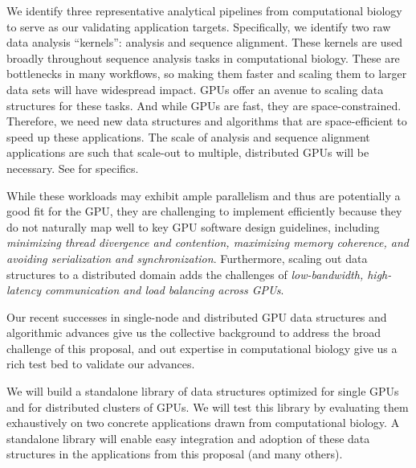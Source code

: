 
We identify three representative analytical pipelines from computational biology to serve as our validating application targets.
Specifically, we identify two raw data analysis ``kernels'':
\Kmer analysis and sequence alignment. These kernels are used broadly
throughout sequence analysis tasks in computational biology. These are bottlenecks in many
workflows, so making them faster and scaling them to larger data
sets will have widespread impact. GPUs offer an avenue to scaling data
structures for these tasks. And while GPUs are fast, they are space-constrained.  Therefore,
we need new data structures and algorithms that are space-efficient to speed up
these applications. The scale of \Kmer analysis and sequence alignment applications are such that scale-out to multiple, distributed GPUs will be necessary. See
 for specifics.

While these workloads may exhibit ample parallelism and thus are potentially a
good fit for the GPU, they are challenging to implement efficiently because
they do not naturally map well to key GPU software design guidelines, including
\emph{minimizing thread divergence and contention, maximizing memory coherence,
and avoiding serialization and synchronization}. Furthermore, scaling out data
structures to a distributed domain adds the challenges of \emph{low-bandwidth,
high-latency communication and load balancing across GPUs}.

Our recent successes in single-node and distributed GPU data structures and
algorithmic advances give us the
collective background to address the broad challenge of this proposal, and out expertise in computational biology give us a rich test bed to validate our advances.

We will build a standalone library of data structures optimized for single GPUs and for distributed clusters of GPUs.
We will test this library by evaluating them exhaustively on two concrete applications drawn from computational biology. 
A standalone library will enable easy integration and adoption of
these data structures in the applications from this proposal (and many others).

